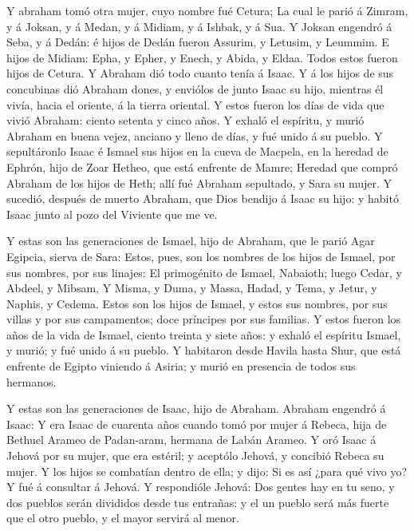  Y abraham tomó otra mujer, cuyo nombre fué Cetura;
 La cual le parió á Zimram, y á Joksan, y á Medan, y á
Midiam, y á Ishbak, y á Sua.  Y Joksan engendró á Seba, y á
Dedán: é hijos de Dedán fueron Assurim, y Letusim, y Leummim.
 E hijos de Midiam: Epha, y Epher, y Enech, y Abida, y
Eldaa. Todos estos fueron hijos de Cetura.  Y Abraham dió
todo cuanto tenía á Isaac.  Y á los hijos de sus concubinas
dió Abraham dones, y enviólos de junto Isaac su hijo, mientras él vivía,
hacia el oriente, á la tierra oriental.  Y estos fueron los
días de vida que vivió Abraham: ciento setenta y cinco años.
 Y exhaló el espíritu, y murió Abraham en buena vejez,
anciano y lleno de días, y fué unido á su pueblo.  Y
sepultáronlo Isaac é Ismael sus hijos en la cueva de Macpela, en la
heredad de Ephrón, hijo de Zoar Hetheo, que está enfrente de Mamre;
 Heredad que compró Abraham de los hijos de Heth; allí fué
Abraham sepultado, y Sara su mujer.  Y sucedió, después de
muerto Abraham, que Dios bendijo á Isaac su hijo: y habitó Isaac junto
al pozo del Viviente que me ve.

 Y estas son las generaciones de Ismael, hijo de Abraham,
que le parió Agar Egipcia, sierva de Sara:  Estos, pues,
son los nombres de los hijos de Ismael, por sus nombres, por sus
linajes: El primogénito de Ismael, Nabaioth; luego Cedar, y Abdeel, y
Mibsam,  Y Misma, y Duma, y Massa,  Hadad, y
Tema, y Jetur, y Naphis, y Cedema.  Estos son los hijos de
Ismael, y estos sus nombres, por sus villas y por sus campamentos; doce
príncipes por sus familias.  Y estos fueron los años de la
vida de Ismael, ciento treinta y siete años: y exhaló el espíritu
Ismael, y murió; y fué unido á su pueblo.  Y habitaron
desde Havila hasta Shur, que está enfrente de Egipto viniendo á Asiria;
y murió en presencia de todos sus hermanos.

 Y estas son las generaciones de Isaac, hijo de Abraham.
Abraham engendró á Isaac:  Y era Isaac de cuarenta años
cuando tomó por mujer á Rebeca, hija de Bethuel Arameo de Padan-aram,
hermana de Labán Arameo.  Y oró Isaac á Jehová por su
mujer, que era estéril; y aceptólo Jehová, y concibió Rebeca su mujer.
 Y los hijos se combatían dentro de ella; y dijo: Si es así
¿para qué vivo yo? Y fué á consultar á Jehová.  Y
respondióle Jehová: Dos gentes hay en tu seno, y dos pueblos serán
divididos desde tus entrañas: y el un pueblo será más fuerte que el otro
pueblo, y el mayor servirá al menor.

